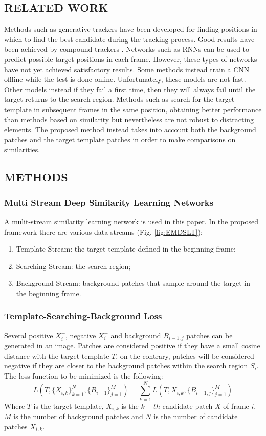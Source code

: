 \subsection{RELATED WORK}
Methods such as generative trackers have been developed for finding positions 
in which to find the best candidate during the tracking process. Good 
results have been achieved by compound trackers \cite{0893551105} \cite{0893551118}. Networks such as 
RNNs \cite{0893551121} can be used to predict possible target positions in each frame. 
However, these types of networks have not yet achieved satisfactory results. 
Some methods instead train a CNN offline while the test is done online. Unfortunately, 
these models are not fast. Other models instead if they fail a first 
time, then they will always fail until the target returns to the search region. 
Methods such as \cite{0893551129} \cite{0893551134} search for the target template in subsequent frames 
in the same position, obtaining better performance than methods based on 
similarity but nevertheless are not robust to distracting elements. The proposed 
method instead takes into account both the background patches and 
the target template patches in order to make comparisons on similarities.

\subsection{METHODS}
\subsubsection{Multi Stream Deep Similarity Learning Networks}
A mulit-stream similarity learning network is used in this paper. In the 
proposed framework there are various data streams (Fig. \ref{fig:EMDSLT}):
\begin{enumerate}
    \item Template Stream: the target template defined in the beginning frame;
    \item Searching Stream: the search region;
    \item Background Stream: background patches that sample around the target 
    in the beginning frame.
\end{enumerate}

\subsubsection{Template-Searching-Background Loss}
Several positive $X^+_i$, negative $X^-_i$ and background $B_{i-1,j}$ patches can be 
generated in an image. Patches are considered positive if they have a small 
cosine distance with the target template $T$, on the contrary, patches will be 
considered negative if they are closer to the background patches within the 
search region $S_i$. The loss function to be minimized is the following:
\begin{equation}
    L(T,\{X_{i,k}\}^N_{k=1}, \{B_{i-1}\}^M_{j=1}) = \sum_{k=1}^NL(T,X_{i,k}, \{B_{i-1,j}\}^M_{j=1})
\end{equation}
Where $T$ is the target template, $X_{i,k}$ is the $k-th$ candidate patch $X$ of frame 
$i$, $M$ is the number of background patches and $N$ is the number of candidate 
patches $X_{i,k}$.

